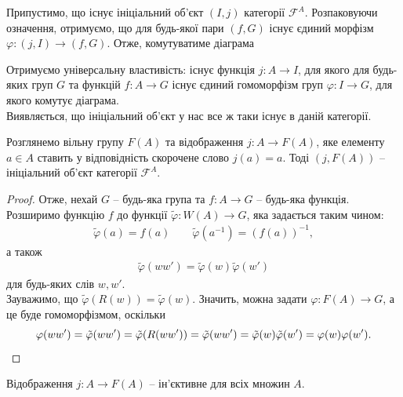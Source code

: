 \documentclass{math_library}
\begin{document}
Припустимо, що існує ініціальний об'єкт $(I,j)$ категорії $\mathcal{F}^A$. Розпаковуючи означення, отримуємо, що для будь-якої пари $(f,G)$ існує єдиний морфізм $\varphi \colon (j,I) \to (f,G)$. Отже, комутуватиме діаграма
\begin{figure}[H]
\centering
{}
\end{figure}
Отримуємо універсальну властивість: існує функція $j \colon A \to I$, для якого для будь-яких груп $G$ та функцій $f \colon A \to G$ існує єдиний гомоморфізм груп $\varphi \colon I \to G$, для якого комутує діаграма.
\bigskip \\
Виявляється, що ініціальний об'єкт у нас все ж таки існує в даній категорії.

\begin{proposition}
Розглянемо вільну групу $F(A)$ та відображення $j \colon A \to F(A)$, яке елементу $a \in A$ ставить у відповідність скорочене слово $j(a) = a$. Тоді $(j,F(A))$ -- ініціальний об'єкт категорії $\mathcal{F}^A$.
\end{proposition}

\begin{proof}
Отже, нехай $G$ -- будь-яка група та $f \colon A \to G$ -- будь-яка функція. Розширимо функцію $f$ до функції $\tilde{\varphi} \colon W(A) \to G$, яка задається таким чином:
\begin{align*}
\tilde{\varphi}(a) = f(a) \qquad \tilde{\varphi}(a^{-1}) = (f(a))^{-1},
\end{align*}
а також
\begin{align*}
\tilde{\varphi}(w w') = \tilde{\varphi}(w) \tilde{\varphi}(w')
\end{align*}
для будь-яких слів $w,w'$.\\
Зауважимо, що $\tilde{\varphi}(R(w)) = \tilde{\varphi}(w)$. Значить, можна задати $\varphi \colon F(A) \to G$, а це буде гомоморфізмом, оскільки 
\[
\varphi(w w') = \tilde{\varphi}(ww') = \tilde{\varphi}(R(ww')) = \tilde{\varphi}(ww') = \tilde{\varphi}(w) \tilde{\varphi}(w') = \varphi(w) \varphi(w'). \qedhere
\]
\end{proof}

\begin{proposition}
Відображення $j \colon A \to F(A)$ -- ін'єктивне для всіх множин $A$.
\end{proposition}
\end{document}
